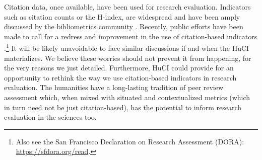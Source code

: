 Citation data, once available, have been used for research evaluation. Indicators such as citation counts or the H-index, are widespread and have been amply discussed by the bibliometrics community \cite{waltman_review_2016}. Recently, public efforts have been made to call for a redress and improvement in the use of citation-based indicators \cite{hicks_bibliometrics_2015}.\footnote{Also see the San Francisco Declaration on Research Assessment (DORA): \url{https://sfdora.org/read}.} It will be likely unavoidable to face similar discussions if and when the HuCI materializes. We believe these worries should not prevent it from happening, for the very reasons we just detailed. Furthermore, HuCI could provide for an opportunity to rethink the way we use citation-based indicators in research evaluation. The humanities have a long-lasting tradition of peer review assessment which, when mixed with situated and contextualized metrics (which in turn need not be just citation-based), has the potential to inform research evaluation in the  sciences too.